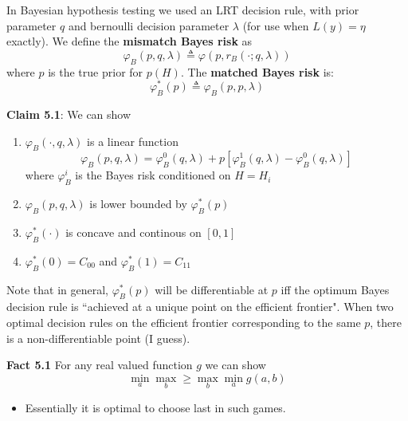 \documentclass[12pt]{article} %
\begin{document}
\separate

In Bayesian hypothesis testing we used an LRT decision rule, with prior parameter $q$ and bernoulli decision parameter $\lambda$ (for use when $L(y) = \eta$ exactly). We define the \textbf{mismatch Bayes risk} as
\begin{equation*}
    \varphi_B(p,q,\lambda) \triangleq \varphi(p,r_B(\cdot;q,\lambda))
\end{equation*}
where $p$ is the true prior for $p(H)$. The \textbf{matched Bayes risk} is:
\begin{equation*}
    \varphi_B^*(p) \triangleq \varphi_B(p,p,\lambda)
\end{equation*}

\textbf{Claim 5.1}: We can show
\begin{enumerate}[topsep=-1pt,itemsep=-1pt]
    \item 
$\varphi_B(\cdot,q,\lambda)$ is a linear function
\begin{equation*}
    \varphi_B(p,q,\lambda) = \varphi_B^0(q,\lambda) + p[\varphi_B^1(q,\lambda) - \varphi_B^0(q,\lambda)]
\end{equation*}
where $\varphi_B^i$ is the Bayes risk conditioned on $H = H_i$

    \item
$\varphi_B(p,q,\lambda)$ is lower bounded by $\varphi_B^*(p)$

    \item
$\varphi_B^*(\cdot)$ is concave and continous on $[0,1]$

    \item
$\varphi_B^*(0) = C_{00}$ and $\varphi_B^*(1) = C_{11}$

\end{enumerate}
Note that in general, $\varphi_B^*(p)$ will be differentiable at $p$ iff the optimum Bayes decision rule is ``achieved at a unique point on the efficient frontier". When two optimal decision rules on the efficient frontier corresponding to the same $p$, there is a non-differentiable point (I guess).

\separate

\textbf{Fact 5.1} For any real valued function $g$ we can show
\begin{equation*}
    \min_a \max_b \geq \max_b \min_a g(a,b)
\end{equation*}
\begin{itemize}[topsep=-1pt]
    \item 
Essentially it is optimal to choose last in such games.
\end{itemize}
\end{document}
